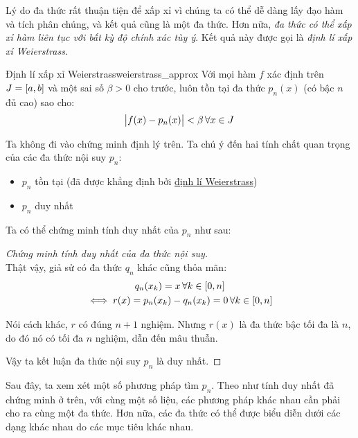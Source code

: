 \documentclass[../../Lectures]{subfiles}
\begin{document}
Lý do đa thức rất thuận tiện để xấp xỉ vì chúng ta có thể dễ dàng lấy đạo hàm và
tích phân chúng, và kết quả cũng là một đa thức. Hơn nữa, \emph{đa thức có thể
xấp xỉ hàm liên tục với bất kỳ độ chính xác tùy ý}. Kết quả này được gọi là
\emph{định lí xấp xỉ Weierstrass}.

\begin{ctheorem}{Định lí xấp xỉ Weierstrass}{weierstrass_approx}
    Với mọi hàm \(f\) xác định trên \(J = \interval{a}{b}\) và một sai số
    \(\beta > 0\) cho trước, luôn tồn tại đa thức \(p_n(x)\) (có bậc \(n\) đủ
    cao) sao cho:
    \[\abs{f(x) - p_n(x)} < \beta \, \forall x \in J\]
\end{ctheorem}

Ta không đi vào chứng minh định lý trên. Ta chú ý đến hai tính chất quan trọng
của các đa thức nội suy \(p_n\):
\begin{itemize}
    \item \(p_n\) tồn tại (đã được khẳng định bởi
        \hyperref[thm:weierstrass_approx]{định lí Weierstrass})
    \item \(p_n\) duy nhất
\end{itemize}

Ta có thể chứng minh tính duy nhất của \(p_n\) như sau:

\begin{proof}[Chứng minh tính duy nhất của đa thức nội suy]\label{proof:polynomial_approx_uniqueness}
    \phantom\\

    Thật vậy, giả sử có đa thức \(q_n\) khác cũng thỏa mãn:
    \begin{gather*}
        q_n(x_k) = x \, \forall k \in \interval{0}{n} \\
        \iff r(x) = p_n(x_k) - q_n(x_k) = 0 \, \forall k \in \interval{0}{n}
    \end{gather*}

    Nói cách khác, \(r\) có đúng \(n + 1\) nghiệm. Nhưng \(r(x)\) là đa thức bậc
    tối đa là \(n\), do đó nó có tối đa \(n\) nghiệm, dẫn đến mâu thuẫn.

    Vậy ta kết luận đa thức nội suy \(p_n\) là duy nhất.
\end{proof}

Sau đây, ta xem xét một số phương pháp tìm \(p_n\). Theo như tính duy nhất đã
chứng minh ở trên, với cùng một số liệu, các phương pháp khác nhau cần phải cho
ra cùng một đa thức. Hơn nữa, các đa thức có thể được biểu diễn dưới các dạng
khác nhau do các mục tiêu khác nhau.
\end{document}
